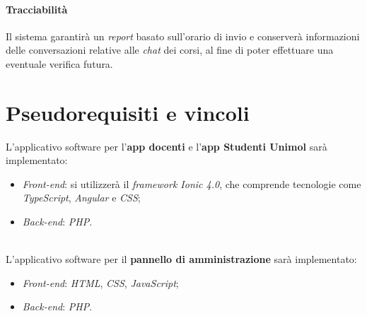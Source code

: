 \paragraph{Tracciabilità\\} 
Il sistema garantirà un \emph{report} basato sull’orario di invio e conserverà informazioni delle conversazioni relative alle \emph{chat} dei corsi, al fine di poter effettuare una eventuale verifica futura. 

\section{Pseudorequisiti e vincoli}
L’applicativo software per l’\textbf{app docenti} e l’\textbf{app Studenti Unimol} sarà implementato:
\begin{itemize}
\item  \emph{Front-end}: si utilizzerà il \emph{framework Ionic 4.0}, che comprende tecnologie come \emph{TypeScript}, \emph{Angular} e \emph{CSS};
\item \emph{Back-end}: \emph{PHP}.
\end{itemize}
\\L’applicativo software per il \textbf{pannello di amministrazione} sarà implementato: 
\begin{itemize}
\item \emph{Front-end}: \emph{HTML}, \emph{CSS}, \emph{JavaScript};
\item \emph{Back-end}: \emph{PHP}.
\end{itemize}
\clearpage